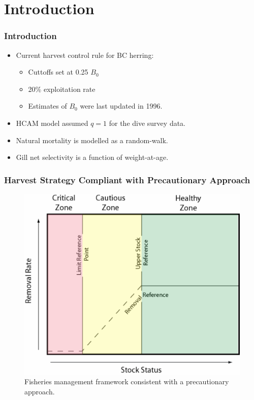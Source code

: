
\section{Introduction} %
\label{sec:introduction}

%
\begin{frame}
	\frametitle{Introduction} 
	\begin{itemize}
		\item Current harvest control rule for BC herring: 
		\begin{itemize}
			\item Cuttoffs set at 0.25 $B_0$ 
			\item 20\% exploitation rate 
			\item Estimates of $B_0$ were last updated in 1996. 
		\end{itemize}
		\item HCAM model assumed $q=1$ for the dive survey data. 
		\item Natural mortality is modelled as a random-walk. 
		\item Gill net selectivity is a function of weight-at-age. 
	\end{itemize}
\end{frame}

%
\begin{frame}
	\frametitle{Harvest Strategy Compliant with Precautionary Approach} 
	\begin{figure}
		[htbp] \centering 
		\includegraphics[width=0.7
		\textwidth]{SSF} \caption{Fisheries management framework consistent with a precautionary approach.} \label{fig:SSF} 
	\end{figure}
\end{frame}

